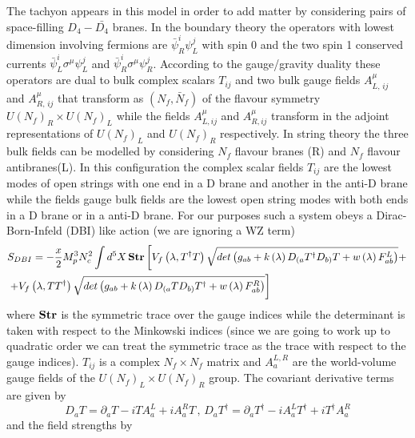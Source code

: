 \documentclass[a4paper,12pt]{article}
\begin{document}
The tachyon appears in this model in order to add matter by considering pairs of space-filling $D_4 - \bar{D_4}$ branes. In the boundary theory the operators with lowest dimension involving fermions are $\bar{\psi}^{i}_R \psi^j_L$ with spin 0 and the two spin 1 conserved currents $\bar{\psi}^i_L \sigma^\mu \psi^j_L$ and $\bar{\psi}^i_R \sigma^\mu \psi^j_R$. According to the gauge/gravity duality these operators are dual to bulk complex scalars $T_{ij}$ and two bulk gauge fields $A^{\mu}_{L ,\, ij}$ and $A^{\mu}_{R,\, ij}$ that transform as $(N_f, \bar{N}_f)$ of the flavour symmetry $U\left(N_f\right)_R \times U \left(N_f\right)_L$ while the fields $A^\mu_{L, i j}$ and $A^\mu_{R, i j}$ transform in the adjoint representations of $U\left(N_f\right)_L$ and  $U \left(N_f\right)_R$ respectively. In string theory the three bulk fields can be modelled by considering $N_f$ flavour branes (R) and $N_f$ flavour antibranes(L).  In this configuration the complex scalar fields $T_{ij}$ are the lowest modes of open strings with one end in a D brane and another in the anti-D brane while the fields gauge bulk fields are the lowest open string modes with both ends in a D brane or in a anti-D brane. For our purposes such a system obeys a Dirac-Born-Infeld (DBI) like action (we are ignoring a WZ term)
\begin{align}
\label{eq: DBI action}
&S_{DBI} = - \frac{x}{2} M_p^3 N_c^2 \int d^5 X \, \bold{Str} \left[ V_f \left(\lambda, T^{\dagger} T\right) \sqrt{det\left( g_{ab} + k\left(\lambda\right)D_{(a}T^{\dagger}D_{b)}T + w\left(\lambda\right) F^{L}_{ab}\right)} + \right. \\ \notag
&\left. + V_f \left(\lambda, T T^{\dagger} \right) \sqrt{det\left( g_{ab} + k\left(\lambda\right)D_{(a}TD_{b)}T^{\dagger} + w\left(\lambda\right) F^{R}_{ab}\right)}  \right]
\end{align}
where $\bold{Str}$ is the symmetric trace over the gauge indices while the determinant is taken with respect to the Minkowski indices (since we are going to work up to quadratic order we can treat the symmetric trace as the trace with respect to the gauge indices). $T_{ij}$ is a complex $N_f \times N_f$ matrix and $A^{L,R}_a$ are the world-volume gauge fields of the $U(N_f)_L \times U(N_f)_R$ group. The covariant derivative terms are given by
\begin{equation}
D_a T = \partial_a T - i T A^L_a + i A^R_a T \, , \, D_a T^{\dagger} = \partial_a T^{\dagger} - i  A^L_a T^{\dagger}+ i T^{\dagger} A^R_a 
\end{equation}
and the field strengths by
\end{document}
